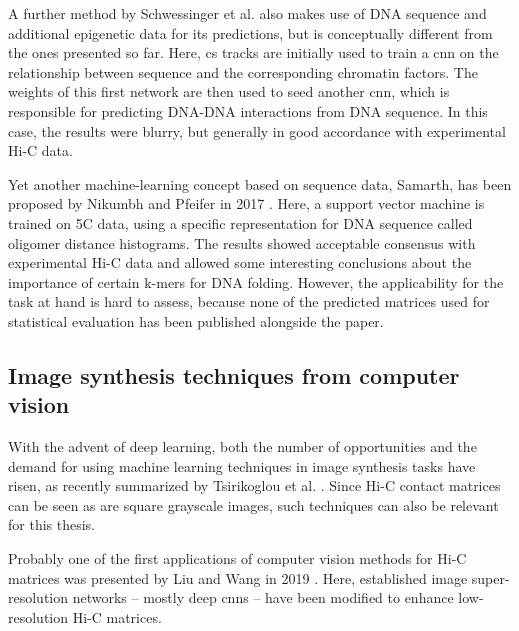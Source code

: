 A further method by Schwessinger et al. \cite{Schwessinger2019} also makes use of DNA sequence and additional epigenetic data for its predictions,
but is conceptually different from the ones presented so far.
Here, \acrshort{cs} tracks are initially used to train a \acrshort{cnn} on the relationship between sequence and 
the corresponding chromatin factors. The weights of this first network are then used to seed another \acrlong{cnn},
which is responsible for predicting DNA-DNA interactions from DNA sequence.
In this case, the results were blurry, but generally in good accordance with experimental Hi-C data.

Yet another machine-learning concept based on sequence data, Samarth, has been proposed by Nikumbh and Pfeifer in 2017 \cite{Nikumbh2017}.
Here, a support vector machine is trained on 5C data, using a specific representation for DNA sequence called oligomer distance histograms.
The results showed acceptable consensus with experimental Hi-C data and allowed some interesting conclusions
about the importance of certain k-mers for DNA folding. However, the applicability for the task at hand is hard to assess, 
because none of the predicted matrices used for statistical evaluation has been published alongside the paper.


\subsection{Image synthesis techniques from computer vision} \label{sec:prior:generativeCV}
With the advent of deep learning, both the number of opportunities and the demand for using machine learning techniques 
in image synthesis tasks have risen, as recently summarized by Tsirikoglou et al. \cite{Tsirikoglou2020}.
Since Hi-C contact matrices can be seen as are square grayscale images, such techniques can also be relevant for this thesis.

Probably one of the first applications of computer vision methods for Hi-C matrices was presented by Liu and Wang in 2019 \cite{Liu2019b}.
Here, established image super-resolution networks -- mostly deep \acrlong{cnn}s -- have been modified to enhance low-resolution Hi-C matrices.

